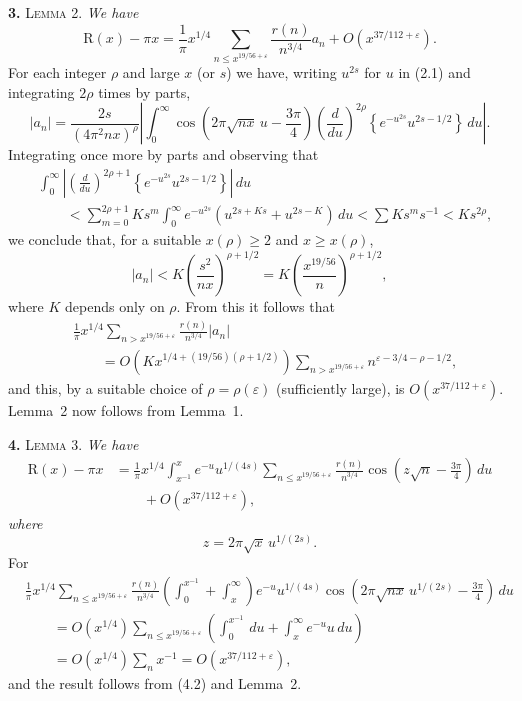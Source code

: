 \documentclass[11pt]{article}
\newcommand{\dd}{\,d}
\begin{document}
\medskip
\noindent\textbf{3.} \textsc{Lemma 2.} \textit{We have}
\[
 \mathrm{R}(x)-\pi x
 =\frac1\pi x^{1/4}\sum_{n\leq x^{19/56+\varepsilon}}
 \frac{r(n)}{n^{3/4}}a_n+O\!\left(x^{37/112+\varepsilon}\right).
\]
For each integer $\rho$ and large $x$ (or $s$) we have, writing $u^{2s}$
for $u$ in (2.1) and integrating $2\rho$ times by parts,
\[
 |a_n|=\frac{2s}{(4\pi^2nx)^\rho}
 \left|\int_0^\infty
 \cos\!\left(2\pi\sqrt{nx}\,u-\frac{3\pi}{4}\right)
 \left(\frac{d}{du}\right)^{2\rho}
 \left\{e^{-u^{2s}}u^{2s-1/2}\right\}\dd u\right|.
\]
Integrating once more by parts and observing that
\begin{align*}
&\int_0^\infty\left|
 \left(\frac{d}{du}\right)^{2\rho+1}
 \left\{e^{-u^{2s}}u^{2s-1/2}\right\}\right|\dd u \\
&\qquad<\sum_{m=0}^{2\rho+1}Ks^m\int_0^\infty e^{-u^{2s}}
 \left(u^{2s+Ks}+u^{2s-K}\right)\dd u
 <\sum Ks^m s^{-1}<Ks^{2\rho},
\end{align*}
we conclude that, for a suitable $x(\rho)\geq2$ and $x\geq x(\rho)$,
\[
 |a_n|<K\left(\frac{s^2}{nx}\right)^{\rho+1/2}
 =K\left(\frac{x^{19/56}}n\right)^{\rho+1/2},
\]
where $K$ depends only on $\rho$. From this it follows that
\begin{align*}
&\frac1\pi x^{1/4}\sum_{n>x^{19/56+\varepsilon}}
 \frac{r(n)}{n^{3/4}}|a_n| \\
&\qquad=O\!\left(Kx^{1/4+(19/56)(\rho+1/2)}\right)
 \sum_{n>x^{19/56+\varepsilon}}n^{\varepsilon-3/4-\rho-1/2},
\end{align*}
and this, by a suitable choice of $\rho=\rho(\varepsilon)$ (sufficiently
large), is $O(x^{37/112+\varepsilon})$. Lemma~2 now follows from Lemma~1.

\medskip
\noindent\textbf{4.} \textsc{Lemma 3.} \textit{We have}
\begin{equation}
\begin{aligned}
 \mathrm{R}(x)-\pi x
 &=\frac1\pi x^{1/4}\int_{x^{-1}}^x e^{-u}u^{1/(4s)}
 \sum_{n\leq x^{19/56+\varepsilon}}\frac{r(n)}{n^{3/4}}
 \cos\!\left(z\sqrt n-\frac{3\pi}{4}\right)\dd u \\
 &\qquad+O\!\left(x^{37/112+\varepsilon}\right),
\end{aligned}
\tag{4.1}
\end{equation}
\textit{where}
\[
 z=2\pi\sqrt{x}\,u^{1/(2s)}.
\]
For
\begin{align*}
&\frac1\pi x^{1/4}\sum_{n\leq x^{19/56+\varepsilon}}
 \frac{r(n)}{n^{3/4}}
 \left(\int_0^{x^{-1}}+\int_x^\infty\right)e^{-u}u^{1/(4s)}
 \cos\!\left(2\pi\sqrt{nx}\,u^{1/(2s)}-\frac{3\pi}{4}\right)\dd u \\
&\qquad=O\!\left(x^{1/4}\right)
 \sum_{n\leq x^{19/56+\varepsilon}}
 \left(\int_0^{x^{-1}}\dd u+\int_x^\infty e^{-u}u\dd u\right) \\
&\qquad=O\!\left(x^{1/4}\right)\sum_n x^{-1}
 =O\!\left(x^{37/112+\varepsilon}\right),
\tag{4.2}
\end{align*}
and the result follows from (4.2) and Lemma~2.
\end{document}
